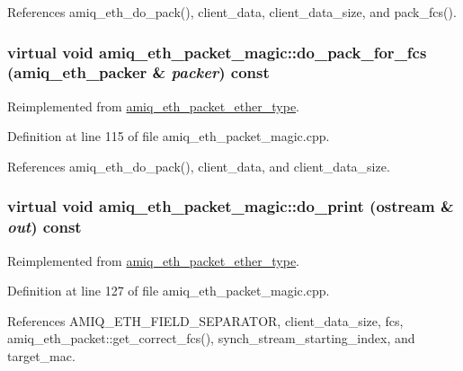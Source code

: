 References amiq\_\-eth\_\-do\_\-pack(), client\_\-data, client\_\-data\_\-size, and pack\_\-fcs().\hypertarget{classamiq__eth__packet__magic_a0a40225ac5c36e70f413cd6d8ffd9a24}{
\subsubsection[{do\_\-pack\_\-for\_\-fcs}]{\setlength{\rightskip}{0pt plus 5cm}virtual void amiq\_\-eth\_\-packet\_\-magic::do\_\-pack\_\-for\_\-fcs ({\bf amiq\_\-eth\_\-packer} \& {\em packer}) const}}
\label{classamiq__eth__packet__magic_a0a40225ac5c36e70f413cd6d8ffd9a24}


Reimplemented from \hyperlink{classamiq__eth__packet__ether__type_aaa85cf778650e1c1b377392a975cb7bc}{amiq\_\-eth\_\-packet\_\-ether\_\-type}.

Definition at line 115 of file amiq\_\-eth\_\-packet\_\-magic.cpp.

References amiq\_\-eth\_\-do\_\-pack(), client\_\-data, and client\_\-data\_\-size.\hypertarget{classamiq__eth__packet__magic_a57354d611adb80b1a8f4ad00c4f307a3}{
\subsubsection[{do\_\-print}]{\setlength{\rightskip}{0pt plus 5cm}virtual void amiq\_\-eth\_\-packet\_\-magic::do\_\-print (ostream \& {\em out}) const}}
\label{classamiq__eth__packet__magic_a57354d611adb80b1a8f4ad00c4f307a3}


Reimplemented from \hyperlink{classamiq__eth__packet__ether__type_a9b2852fa1aaf278138fde2232e446f63}{amiq\_\-eth\_\-packet\_\-ether\_\-type}.

Definition at line 127 of file amiq\_\-eth\_\-packet\_\-magic.cpp.

References AMIQ\_\-ETH\_\-FIELD\_\-SEPARATOR, client\_\-data\_\-size, fcs, amiq\_\-eth\_\-packet::get\_\-correct\_\-fcs(), synch\_\-stream\_\-starting\_\-index, and target\_\-mac.

